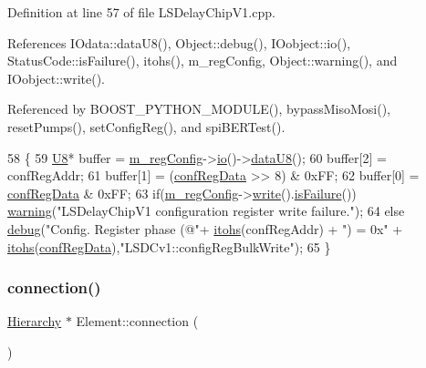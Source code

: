 Definition at line 57 of file L\+S\+Delay\+Chip\+V1.\+cpp.



References I\+Odata\+::data\+U8(), Object\+::debug(), I\+Oobject\+::io(), Status\+Code\+::is\+Failure(), itohs(), m\+\_\+reg\+Config, Object\+::warning(), and I\+Oobject\+::write().



Referenced by B\+O\+O\+S\+T\+\_\+\+P\+Y\+T\+H\+O\+N\+\_\+\+M\+O\+D\+U\+L\+E(), bypass\+Miso\+Mosi(), reset\+Pumps(), set\+Config\+Reg(), and spi\+B\+E\+R\+Test().


\begin{DoxyCode}
58 \{
59     \hyperlink{ICECALv3_8h_a3cb25ca6f51f003950f9625ff05536fc}{U8}* buffer = \hyperlink{classLSDelayChipV1_afd1cfdcb114549dc1466c77f07d39fe0}{m\_regConfig}->\hyperlink{classIOobject_af04fb94137c3d86849f478ac5afab5d1}{io}()->\hyperlink{classIOdata_a75e9c318dbac3a39402179070943d4bc}{dataU8}();
60     buffer[2] = confRegAddr;
61     buffer[1] = (\hyperlink{structconfRegData}{confRegData} >> 8) & 0xFF;
62     buffer[0] =  \hyperlink{structconfRegData}{confRegData}       & 0xFF;
63     \textcolor{keywordflow}{if}(\hyperlink{classLSDelayChipV1_afd1cfdcb114549dc1466c77f07d39fe0}{m\_regConfig}->\hyperlink{classIOobject_a9f6984bc9f0fadcf800f1be2523ac744}{write}().\hyperlink{classStatusCode_a5dd22dc6eb2c52fc4cabc58f6dea2eb7}{isFailure}())   \hyperlink{classObject_a65cd4fda577711660821fd2cd5a3b4c9}{warning}(\textcolor{stringliteral}{"LSDelayChipV1
       configuration register write failure."});
64     \textcolor{keywordflow}{else}                                    \hyperlink{classObject_aac010553f022165573714b7014a15f0d}{debug}(\textcolor{stringliteral}{"Config. Register phase (@"}+ 
      \hyperlink{classLSDelayChipV1_af7f4d72fb404b6b3d7b41fd01876ed0a}{itohs}(confRegAddr) + \textcolor{stringliteral}{") = 0x"} + \hyperlink{classLSDelayChipV1_af7f4d72fb404b6b3d7b41fd01876ed0a}{itohs}(\hyperlink{structconfRegData}{confRegData}),\textcolor{stringliteral}{"LSDCv1::configRegBulkWrite"});
65 \}
\end{DoxyCode}
\mbox{\label{classElement_af57444353c1ddf9fa0109801e97debf7}} 
\subsubsection{\texorpdfstring{connection()}{connection()}}
{\footnotesize\ttfamily \hyperlink{classHierarchy}{Hierarchy} $\ast$ Element\+::connection (\begin{DoxyParamCaption}{ }\end{DoxyParamCaption})\hspace{0.3cm}{\ttfamily [inherited]}}

